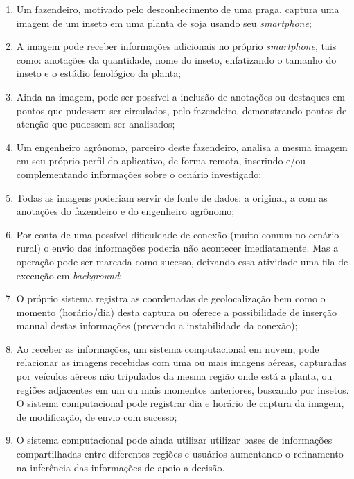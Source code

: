 \begin{enumerate}
	\item Um fazendeiro, motivado pelo desconhecimento de uma praga, captura uma imagem de um inseto em uma planta de soja usando seu \textit{smartphone};
	\item A imagem pode receber informações adicionais no próprio \textit{smartphone}, tais como: anotações da quantidade, nome do inseto, enfatizando o tamanho do inseto e o estádio fenológico da planta;
	\item Ainda na imagem, pode ser possível a inclusão de anotações ou destaques em pontos que pudessem ser circulados, pelo fazendeiro, demonstrando pontos de atenção que pudessem ser analisados;
	\item Um engenheiro agrônomo, parceiro deste fazendeiro, analisa a mesma imagem em seu próprio perfil do aplicativo, de forma remota, inserindo e/ou complementando informações sobre o cenário investigado;
	\item Todas as imagens poderiam servir de fonte de dados: a original, a com as anotações do fazendeiro e do engenheiro agrônomo;
	\item Por conta de uma possível dificuldade de conexão (muito comum no cenário rural) o envio das informações poderia não acontecer imediatamente. Mas a operação pode ser marcada como sucesso, deixando essa atividade uma fila de execução em \textit{background};
	\item O próprio sistema registra as coordenadas de geolocalização bem como o momento (horário/dia) desta captura ou oferece a possibilidade de inserção manual destas informações (prevendo a instabilidade da conexão);
	\item Ao receber as informações, um sistema computacional em nuvem, pode relacionar as imagens recebidas com uma ou mais imagens aéreas, capturadas por veículos aéreos não tripulados da mesma região onde está a planta, ou regiões adjacentes em um ou mais momentos anteriores, buscando por insetos. O sistema computacional pode registrar dia e horário de captura da imagem, de modificação, de envio com sucesso;
	\item O sistema computacional pode ainda utilizar utilizar bases de informações compartilhadas entre diferentes regiões e usuários aumentando o refinamento na inferência das informações de apoio a decisão.
\end{enumerate}

